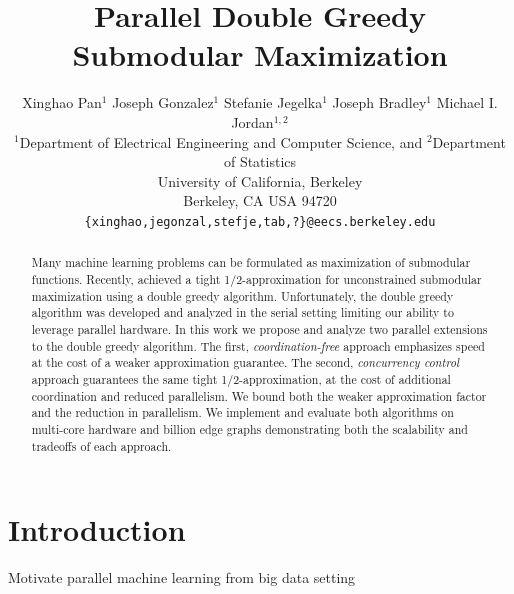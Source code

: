 \documentclass{article} %
\title{Parallel Double Greedy Submodular Maximization}
\author{
Xinghao Pan$^1$ Joseph Gonzalez$^1$ Stefanie Jegelka$^1$ Joseph Bradley$^{1}$ Michael I. Jordan$^{1,2}$\\
$^1$Department of Electrical Engineering and Computer Science, and $^2$Department of Statistics\\
University of California, Berkeley\\
Berkeley, CA USA 94720\\
  \texttt{\{xinghao,jegonzal,stefje,tab,?\}@eecs.berkeley.edu} \\
}
\begin{document}
\maketitle


\begin{abstract}
Many machine learning problems can be formulated as maximization of submodular functions.
Recently, \cite{buchbinder2012} achieved a tight 1/2-approximation for unconstrained submodular maximization using a double greedy algorithm.
Unfortunately, the double greedy algorithm was developed and analyzed in the serial setting limiting our ability to leverage parallel hardware.
In this work we propose and analyze two parallel extensions to the \cite{buchbinder2012} double greedy algorithm.
The first, \emph{coordination-free} approach emphasizes speed at the cost of a weaker approximation guarantee.
The second, \emph{concurrency control} approach guarantees the same tight 1/2-approximation, at the cost of additional coordination and reduced parallelism.
We bound both the weaker approximation factor and the reduction in parallelism.
We implement and evaluate both algorithms on multi-core hardware and billion edge graphs demonstrating both the scalability and tradeoffs of each approach.


\end{abstract}

\section{Introduction}


Motivate parallel machine learning from big data setting
\end{document}
